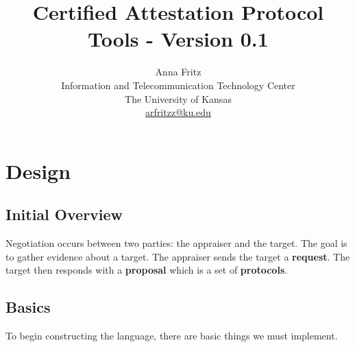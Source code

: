 \documentclass[10pt]{report}
\title{Certified Attestation Protocol Tools - Version 0.1}
\author{Anna Fritz \\
  Information and Telecommunication Technology Center \\
  The University of Kansas \\
  \url{arfritzz@ku.edu}
}
\begin{document}
\chapter {Design}

\section {Initial Overview}

  Negotiation occurs between two parties: the appraiser and the target. The goal is to gather evidence about a target.
  The appraiser sends the target a \textbf{request}. The target then responds
  with a \textbf{proposal} which is a set of \textbf{protocols}.

\section {Basics}

To begin constructing the language, there are basic things we must implement. 
\end{document}
